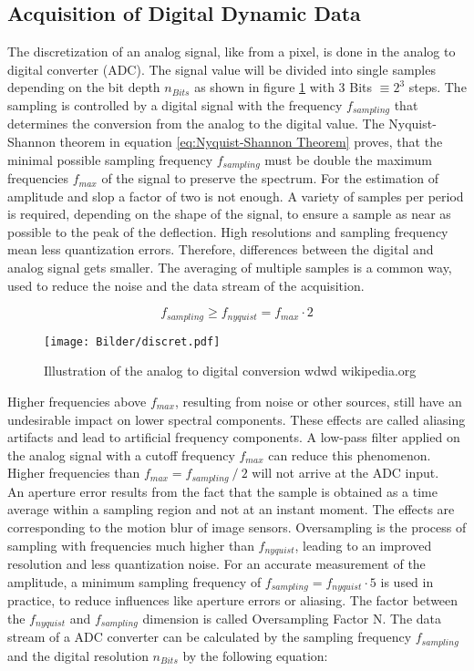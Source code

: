\newpage
\subsection{Acquisition of Digital Dynamic Data}

The discretization of an analog signal, like from a pixel, is done in the analog to digital converter (ADC). The signal value will be divided into single samples depending on the bit depth $n_{Bits}$ as shown in figure \ref{fig:nyquistthereom} with 3 Bits $\equiv 2^3$ steps. The sampling is controlled by a digital signal with the frequency $f_{sampling}$ that determines the conversion from the analog to the digital value. The Nyquist-Shannon theorem in equation \ref{eq:Nyquist-Shannon Theorem} proves, that the minimal possible sampling frequency $f_{sampling}$ must be double the maximum frequencies $f_{max}$ of the signal to preserve the spectrum. For the estimation of amplitude and slop a factor of two is not enough. A variety of samples per period is required, depending on the shape of the signal, to ensure a sample as near as possible to the peak of the deflection. High resolutions and sampling frequency mean less quantization errors. Therefore, differences between the digital and analog signal gets smaller. The averaging of multiple samples is a common way, used to reduce the noise and the data stream of the acquisition.

\begin{equation}
f_{sampling}\geq f_{nyquist} = f_{max} \cdot 2 
\label{eq:Nyquist-Shannon Theorem} 
\end{equation}

\begin{figure}[!h]
	\centering
	\texttt{[image: Bilder/discret.pdf]}
	\caption{Illustration of the analog to digital conversion \tiny wdwd wikipedia.org}
	\label{fig:nyquistthereom}
\end{figure}

Higher frequencies above $f_{max}$, resulting from noise or other sources, still have an undesirable impact on lower spectral components. These effects are called aliasing artifacts and lead to artificial frequency components. A low-pass filter applied on the analog signal with a cutoff frequency $f_{max}$ can reduce this phenomenon. Higher frequencies than $f_{max} = f_{sampling}~/~2$ will not arrive at the ADC input.\\

An aperture error results from the fact that the sample is obtained as a time average within a sampling region and not at an instant moment. The effects are corresponding to the motion blur of image sensors. Oversampling is the process of sampling with frequencies much higher than $f_{nyquist}$, leading to an improved resolution and less quantization noise. For an accurate measurement of the amplitude, a minimum sampling frequency of $f_{sampling} = f_{nyquist}\cdot 5$ is used in practice, to reduce influences like aperture errors or aliasing. The factor between the $f_{nyquist}$ and $f_{sampling}$ dimension is called Oversampling Factor N. The data stream of a ADC converter can be calculated by the sampling frequency $f_{sampling}$ and the digital resolution $n_{Bits}$ by the following equation:

